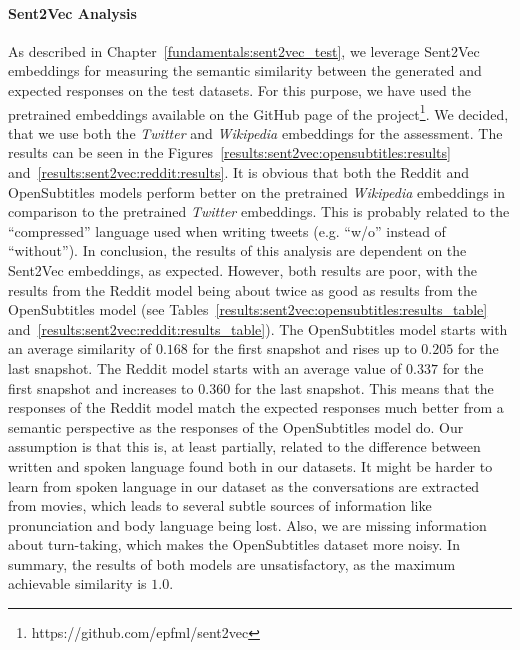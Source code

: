 \paragraph{Sent2Vec Analysis} As described in Chapter~\ref{fundamentals:sent2vec_test}, we leverage Sent2Vec embeddings for measuring the semantic similarity between the generated and expected responses on the test datasets. For this purpose, we have used the pretrained embeddings available on the GitHub page of the project\footnote{https://github.com/epfml/sent2vec}. We decided, that we use both the \emph{Twitter} and \emph{Wikipedia} embeddings for the assessment. The results can be seen in the Figures~\ref{results:sent2vec:opensubtitles:results} and~\ref{results:sent2vec:reddit:results}. It is obvious that both the Reddit and OpenSubtitles models perform better on the pretrained \emph{Wikipedia} embeddings in comparison to the pretrained \emph{Twitter} embeddings. This is probably related to the ``compressed'' language used when writing tweets (e.g. ``w/o'' instead of ``without''). In conclusion, the results of this analysis are dependent on the Sent2Vec embeddings, as expected. However, both results are poor, with the results from the Reddit model being about twice as good as results from the OpenSubtitles model (see Tables~\ref{results:sent2vec:opensubtitles:results_table} and~\ref{results:sent2vec:reddit:results_table}). The OpenSubtitles model starts with an average similarity of $0.168$ for the first snapshot and rises up to $0.205$ for the last snapshot. The Reddit model starts with an average value of $0.337$ for the first snapshot and increases to $0.360$ for the last snapshot. This means that the responses of the Reddit model match the expected responses much better from a semantic perspective as the responses of the OpenSubtitles model do. Our assumption is that this is, at least partially, related to the difference between written and spoken language found both in our datasets. It might be harder to learn from spoken language in our dataset as the conversations are extracted from movies, which leads to several subtle sources of information like pronunciation and body language being lost. Also, we are missing information about turn-taking, which makes the OpenSubtitles dataset more noisy. In summary, the results of both models are unsatisfactory, as the maximum achievable similarity is $1.0$.

